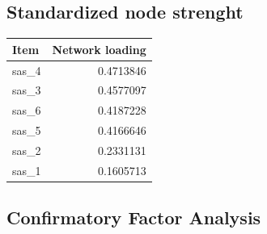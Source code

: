 \documentclass[
  letterpaper,
  DIV=11,
  numbers=noendperiod]{scrreprt}
\newenvironment{Shaded}{\begin{snugshade}}{\end{snugshade}}
\newcommand{\AttributeTok}[1]{\textcolor[rgb]{0.40,0.45,0.13}{#1}}
\newcommand{\CommentTok}[1]{\textcolor[rgb]{0.37,0.37,0.37}{#1}}
\newcommand{\FunctionTok}[1]{\textcolor[rgb]{0.28,0.35,0.67}{#1}}
\newcommand{\NormalTok}[1]{\textcolor[rgb]{0.00,0.23,0.31}{#1}}
\newcommand{\SpecialCharTok}[1]{\textcolor[rgb]{0.37,0.37,0.37}{#1}}
\newcommand{\StringTok}[1]{\textcolor[rgb]{0.13,0.47,0.30}{#1}}
\begin{document}
\hypertarget{standardized-node-strenght}{%
\subsection{Standardized node
strenght}\label{standardized-node-strenght}}

\begin{Shaded}
\end{Shaded}

\begin{tabular}[t]{l|r}
\hline
Item & Network loading\\
\hline
sas\_4 & 0.4713846\\
\hline
sas\_3 & 0.4577097\\
\hline
sas\_6 & 0.4187228\\
\hline
sas\_5 & 0.4166646\\
\hline
sas\_2 & 0.2331131\\
\hline
sas\_1 & 0.1605713\\
\hline
\end{tabular}

\hypertarget{confirmatory-factor-analysis}{%
\subsection{Confirmatory Factor
Analysis}\label{confirmatory-factor-analysis}}
\end{document}
